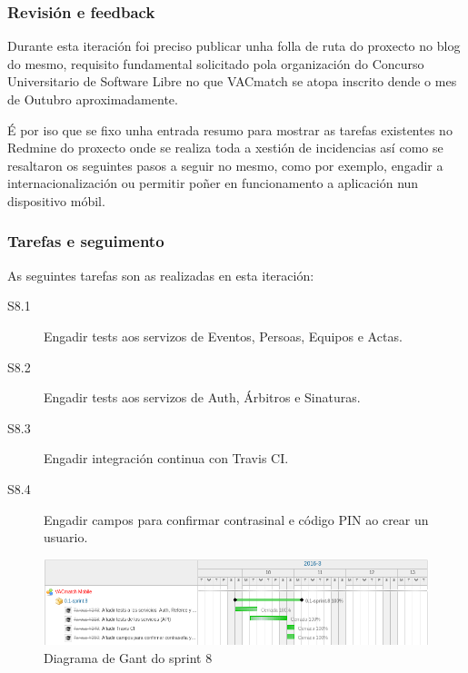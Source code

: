       \subsubsection{Revisión e feedback}
      Durante esta iteración foi preciso publicar unha folla de ruta do 
proxecto no blog do mesmo, requisito fundamental solicitado pola organización 
do Concurso Universitario de Software Libre no que VACmatch se atopa inscrito 
dende o mes de Outubro aproximadamente.

      É por iso que se fixo unha entrada resumo para mostrar as tarefas 
existentes no Redmine do proxecto onde se realiza toda a xestión de 
incidencias así como se resaltaron os seguintes pasos a seguir no mesmo, como 
por exemplo, engadir a internacionalización ou permitir poñer en funcionamento 
a aplicación nun dispositivo móbil.

      \subsubsection{Tarefas e seguimento}

      As seguintes tarefas son as realizadas en esta iteración:

        \begin{description}
         \item [S8.1] Engadir tests aos servizos de Eventos, Persoas, Equipos e 
Actas.
         \item [S8.2] Engadir tests aos servizos de Auth, Árbitros e Sinaturas.
         \item [S8.3] Engadir integración continua con Travis CI.
         \item [S8.4] Engadir campos para confirmar contrasinal e código PIN ao 
crear un usuario.
        \end{description}

        \begin{figure}[h!]
          \begin{center}
          \includegraphics[width=\textwidth]{./img/gant_diagrams/08.png}
          \caption{Diagrama de Gant do sprint 8}
          \label{fig:gant08}
          \end{center}
        \end{figure}


